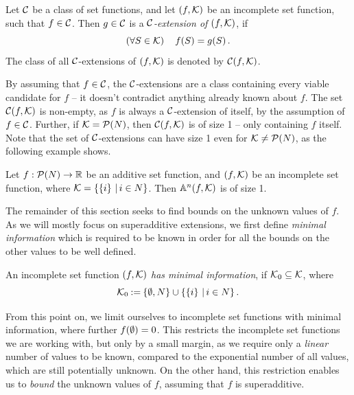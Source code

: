 \begin{defi}[$ \C $-extension]
  Let $ \C $ be a class of set functions, and let $ \left( f, \mathcal{K} \right) $ be an incomplete set function, such that $ f \in \mathcal{C} $.
  Then $ g \in \mathcal{C} $ is a \emph{$ \C $-extension of $ \left( f,\mathcal{K} \right) $}, if \[
    \left( \forall S \in \mathcal{K} \right)\quad f\!\left(S\right) = g\!\left(S\right).
  \]
  The class of all $ \C $-extensions of $ \left( f,\mathcal{K} \right) $ is denoted by $ \mathcal{C}\!\left(f, \mathcal{K}\right) $.
\end{defi}

By assuming that $ f \in \mathcal{C} $, the $ \C $-extensions are a class containing every viable candidate for $ f $ -- it doesn't contradict anything already known about $ f $.
The set $ \mathcal{C}\!\left(f, \mathcal{K}\right) $ is non-empty, as $ f $ is always a $ \C $-extension of itself, by the assumption of $ f \in \mathcal{C} $.
Further, if $ \mathcal{K} = \mathcal{P}\!\left(N\right) $, then $ \mathcal{C}\!\left(f, \mathcal{K}\right) $ is of size 1 -- only containing $ f $ itself.
Note that the set of $ \C $-extensions can have size 1 even for $ \mathcal{K} \neq \mathcal{P}\!\left(N\right) $, as the following example shows.

\begin{example}[ ]
  Let $ f: \mathcal{P}\!\left(N\right) \to \mathbb{R} $ be an additive set function, and $ \left( f, \mathcal{K} \right) $ be an incomplete set function, where $ \mathcal{K} = \left\{ \left\{ i \right\} \,|\, i \in N \right\} $.
  Then $ \mathbb{A}^n\!\left(f, \mathcal{K}\right) $ is of size 1.
\end{example}

The remainder of this section seeks to find bounds on the unknown values of $ f $.
As we will mostly focus on superadditive extensions, we first define \emph{minimal information} which is required to be known in order for all the bounds on the other values to be well defined.

\begin{defi}
  An incomplete set function $ \left( f,\mathcal{K} \right) $ \emph{has minimal information}, if $ \mathcal{K}_0 \subseteq \mathcal{K} $, where \[
    \mathcal{K}_0 \mathbin{:=} \left\{ \emptyset, N \right\} \cup \left\{ \left\{ i \right\} \,|\, i \in N \right\}.
  \]
\end{defi}

From this point on, we limit ourselves to incomplete set functions with minimal information, where further $ f\!\left(\emptyset\right) = 0 $.
This restricts the incomplete set functions we are working with, but only by a small margin, as we require only a \emph{linear} number of values to be known, compared to the exponential number of all values, which are still potentially unknown.
On the other hand, this restriction enables us to \emph{bound} the unknown values of $ f $, assuming that $ f $ is superadditive.


